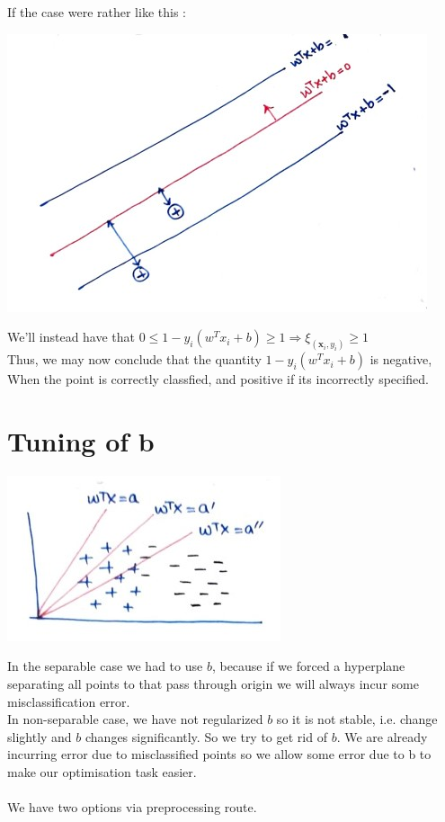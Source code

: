 \documentclass[12pt]{article}
\begin{document}
If the case were rather like this : 

\begin{center}
    \includegraphics[scale=0.8]{image1.jpg}    
\end{center}

We'll instead have that $0 \leq 1-y_i(w^T x_i + b) \geq 1 \Rightarrow {\xi_{(\boldsymbol{x}_i, y_i)}} \geq 1$ \\

Thus, we may now conclude that the quantity $1-y_i(w^T x_i + b)$ is negative, When the point is correctly classfied, and positive if its incorrectly specified.


\section{Tuning of b}
\begin{center}
    \includegraphics[scale=0.75]{Tuning-b.jpg}    
\end{center}
    In the separable case we had to use $b$, because if we forced a hyperplane separating all points to that pass through origin we will always incur some misclassification error. \\
    In non-separable case, we have not regularized $b$ so it is not stable, i.e. change  slightly and $b$ changes significantly. So we try to get rid of $b$. We are already incurring error due to misclassified points so we allow some error due to b to make our optimisation task easier. \\ \\
    We have two options via preprocessing route.
\end{document}
